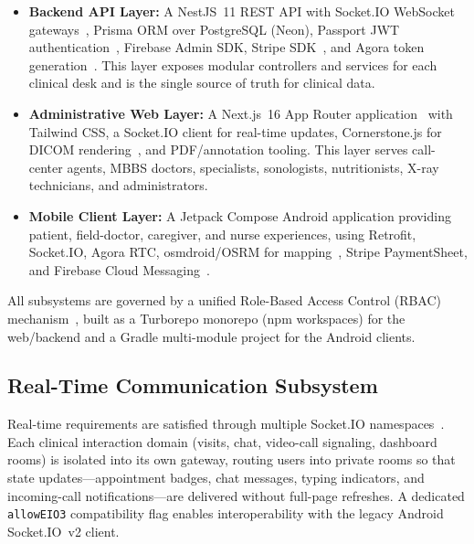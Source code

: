 \documentclass[conference]{IEEEtran}
\begin{document}
\begin{itemize}
\item \textbf{Backend API Layer:} A NestJS~11 REST API with Socket.IO WebSocket gateways~, Prisma ORM over PostgreSQL (Neon), Passport JWT authentication~\cite{jones2015jwt}, Firebase Admin SDK, Stripe SDK~\cite{stripe2024api}, and Agora token generation~\cite{agorawebrtc}. This layer exposes modular controllers and services for each clinical desk and is the single source of truth for clinical data.
\item \textbf{Administrative Web Layer:} A Next.js~16 App Router application~ with Tailwind CSS, a Socket.IO client for real-time updates, Cornerstone.js for DICOM rendering~\cite{dicom2021}, and PDF/annotation tooling. This layer serves call-center agents, MBBS doctors, specialists, sonologists, nutritionists, X-ray technicians, and administrators.
\item \textbf{Mobile Client Layer:} A Jetpack Compose Android application providing patient, field-doctor, caregiver, and nurse experiences, using Retrofit, Socket.IO, Agora RTC, osmdroid/OSRM for mapping~\cite{osmdroid2024}, Stripe PaymentSheet, and Firebase Cloud Messaging~\cite{firebase2024fcm}.
\end{itemize}

All subsystems are governed by a unified Role-Based Access Control (RBAC) mechanism~, built as a Turborepo monorepo (npm workspaces) for the web/backend and a Gradle multi-module project for the Android clients.

\subsection{Real-Time Communication Subsystem}
Real-time requirements are satisfied through multiple Socket.IO namespaces~\cite{fette2011websocket}. Each clinical interaction domain (visits, chat, video-call signaling, dashboard rooms) is isolated into its own gateway, routing users into private rooms so that state updates---appointment badges, chat messages, typing indicators, and incoming-call notifications---are delivered without full-page refreshes. A dedicated \texttt{allowEIO3} compatibility flag enables interoperability with the legacy Android Socket.IO~v2 client.
\end{document}
